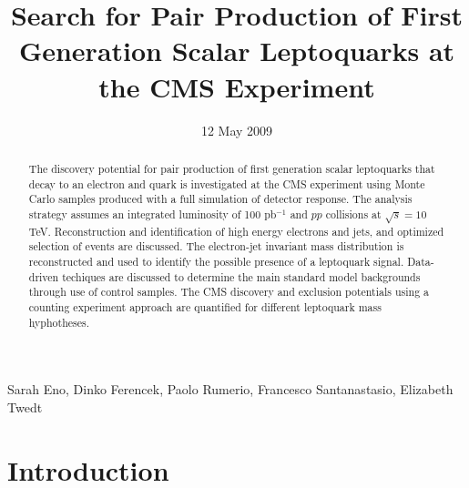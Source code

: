 
%

\begin{titlepage}

   \date{12 May 2009}


  \title{Search for Pair Production of First Generation Scalar Leptoquarks at the CMS Experiment}

  \begin{Authlist}
   Sarah Eno, Dinko Ferencek, Paolo Rumerio, Francesco Santanastasio, Elizabeth Twedt
  \end{Authlist}


  \begin{abstract}
    The discovery potential for pair production of first generation scalar leptoquarks that 
    decay to an electron and quark is investigated 
    at the CMS experiment using Monte Carlo samples produced with a full simulation of detector response.  
    The analysis strategy assumes an integrated luminosity of 100 pb$^{-1}$ and $pp$ collisions 
    at $\sqrt{s}=10$ TeV.
    Reconstruction and identification of high energy electrons and jets, 
    and optimized selection of events are discussed.
    The electron-jet invariant mass distribution is reconstructed
    and used to identify the possible presence of a leptoquark signal.
    Data-driven techiques are discussed to determine the main standard model backgrounds through use of 
    control samples. The CMS discovery and exclusion potentials using a counting experiment approach 
    are quantified for different leptoquark mass hyphotheses.

  \end{abstract} 

\end{titlepage}

\setcounter{page}{2}%

\section{Introduction}

